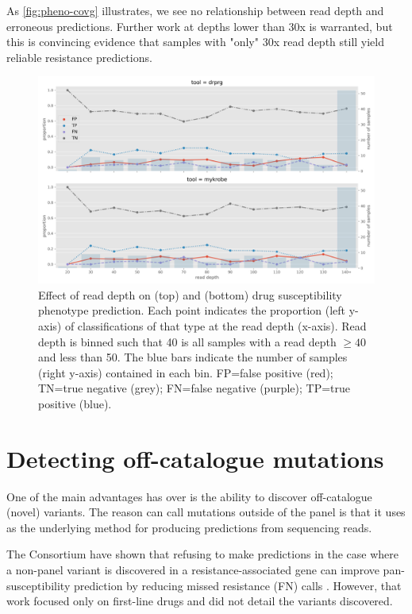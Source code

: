 As \autoref{fig:pheno-covg} illustrates, we see no relationship between \ont{} read depth and erroneous predictions. Further work at depths lower than 30x is warranted, but this is convincing evidence that samples with "only" 30x \ont{} read depth still yield reliable resistance predictions. 

\begin{figure}
\begin{center}
\includegraphics[width=0.90\columnwidth]{Chapter3/Figs/phenotype_coverage.png}
\caption{{Effect of \ont{} read depth on \drprg{} (top) and \mykrobe{} (bottom) drug susceptibility phenotype prediction. Each point indicates the proportion (left y-axis) of classifications of that type at the read depth (x-axis). Read depth is binned such that 40 is all samples with a read depth $\ge40$ and less than 50. The blue bars indicate the number of samples (right y-axis) contained in each bin. FP=false positive (red); TN=true negative (grey); FN=false negative (purple); TP=true positive (blue).
{\label{fig:pheno-covg}}
}}
\end{center}
\end{figure}
\section{Detecting off-catalogue mutations}
\label{sec:drprg-discover}

One of the main advantages \drprg{} has over \mykrobe{} is the ability to discover off-catalogue (novel) variants. The reason \drprg{} can call mutations outside of the panel is that it uses \pandora{} as the underlying method for producing predictions from sequencing reads.

The \cryptic{} Consortium have shown that refusing to make predictions in the case where a non-panel variant is discovered in a resistance-associated gene can improve pan-susceptibility prediction by reducing missed resistance (FN) calls \cite{cryptic2018}. However, that work focused only on first-line drugs and did not detail the variants discovered. 

